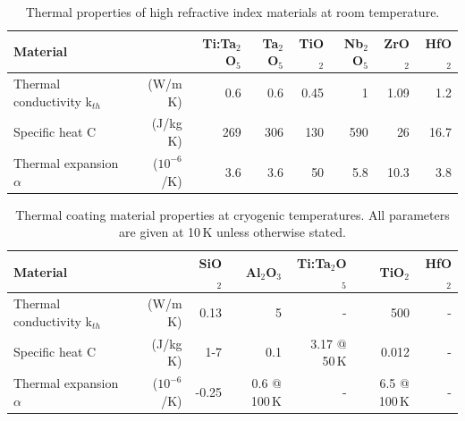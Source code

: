 \begin{table}[h!]
\begin{center}
\begin{tabular}{|l r||r|r|r|r|r|r|}
  \hline 
   {\large\strut} Material  & & Ti:Ta$_2$O$_5$ & Ta$_2$O$_5$ & TiO$_2$ & Nb$_2$O$_5$ & ZrO$_2$ & HfO$_2$ \\ \hline \hline
   {\large\strut} Thermal conductivity k$_{th}$ & (W/m K) & 0.6 & 0.6 & 0.45 & 1 & 1.09 & 1.2 \\
   {\large\strut} Specific heat C & (J/kg K) & 269 & 306 & 130 & 590 & 26 & 16.7 \\
   {\large\strut} Thermal expansion $\alpha$ & ($10^{-6}$/K) & 3.6 & 3.6 & 50 & 5.8 & 10.3 & 3.8 \\
  \hline
\end{tabular}
\caption{Thermal properties of high refractive index materials at room temperature.}
\end{center}
\label{tab:Therm_CoatHighRef_Param}
\end{table}

\begin{table}[h!]
\begin{center}
\begin{tabular}{|l r||r|r|r|r|r|}
  \hline
    {\large\strut} Material  & & SiO$_2$ & Al$_2$O$_3$ & Ti:Ta$_2$O$_5$ & TiO$_2$ & HfO$_2$ \\
  \hline
  \hline
   {\large\strut} Thermal conductivity k$_{th}$ & (W/m K) & 0.13  & 5 & - & 500 & - \\
   {\large\strut} Specific heat C & (J/kg K) & 1-7  &  0.1 & 3.17 @ 50\,K & 0.012 & - \\
   {\large\strut} Thermal expansion $\alpha$ & ($10^{-6}$/K) & -0.25 & 0.6 @ 100\,K & - & 6.5 @ 100\,K & - \\
     \hline
\end{tabular}
\caption{Thermal coating material properties at cryogenic temperatures. All parameters are given at 10\,K unless otherwise stated.}
\end{center}
\label{tab:Therm_Coat_Param_cryo}
\end{table}


